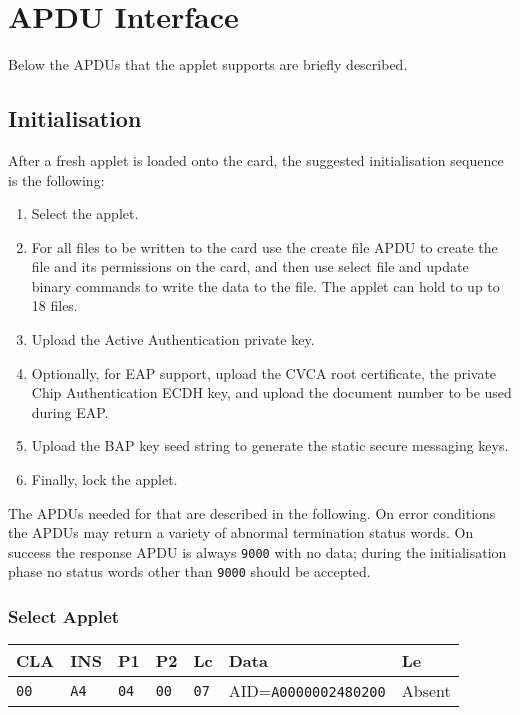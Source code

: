 \documentclass{article}
\begin{document}
\section{APDU Interface}

Below the APDUs that the applet supports are briefly described.

\subsection{Initialisation}

After a fresh applet is loaded onto the card, the suggested initialisation
sequence is the following:
\begin{enumerate}
\item Select the applet.
\item For all files to be written to the card use the create file APDU
  to create the file and its permissions on the card, and then use
  select file and update binary commands to write the data to the
  file. The applet can hold to up to 18 files.
\item Upload the Active Authentication private key.
\item Optionally, for EAP support, upload the CVCA root certificate,
  the private Chip Authentication ECDH key, and upload the document
  number to be used during EAP.
\item Upload the BAP key seed string to generate the static secure
  messaging keys.
\item Finally, lock the applet.
\end{enumerate}
The APDUs needed for that are described in the following. On error
conditions the APDUs may return a variety of abnormal termination
status words. On success the response APDU is always \texttt{9000}
with no data; during the initialisation phase
no status words other than \texttt{9000} should be accepted.

\subsubsection{Select Applet}

\begin{flushleft}
\begin{tabular}{|l|l|l|l|l|l|l|}
\hline
CLA & INS & P1 & P2 & Lc & Data & Le \\
\hline
\texttt{00} & \texttt{A4} & \texttt{04} & \texttt{00} &
\texttt{07} & AID=\texttt{A0000002480200} & Absent \\
\hline
\end{tabular}
\end{flushleft}
\end{document}
